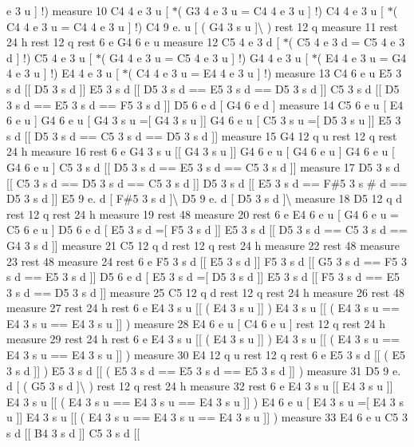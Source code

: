 e 3 u \mbox{]} !) measure 10 C4 4 e 3 u \mbox{[} $\ast$( G3 4 e 3 u = C4 4 e 3 u \mbox{]} !) C4 4 e 3 u \mbox{[} $\ast$( C4 4 e 3 u = C4 4 e 3 u \mbox{]} !) C4 9 e. u \mbox{[} ( G4 3 s u \mbox{]}\textbackslash{} ) rest 12 q measure 11 rest 24 h rest 12 q rest 6 e G4 6 e u measure 12 C5 4 e 3 d \mbox{[} $\ast$( C5 4 e 3 d = C5 4 e 3 d \mbox{]} !) C5 4 e 3 u \mbox{[} $\ast$( G4 4 e 3 u = C5 4 e 3 u \mbox{]} !) G4 4 e 3 u \mbox{[} $\ast$( E4 4 e 3 u = G4 4 e 3 u \mbox{]} !) E4 4 e 3 u \mbox{[} $\ast$( C4 4 e 3 u = E4 4 e 3 u \mbox{]} !) measure 13 C4 6 e u E5 3 s d \mbox{[}\mbox{[} D5 3 s d \mbox{]}\mbox{]} E5 3 s d \mbox{[}\mbox{[} D5 3 s d == E5 3 s d == D5 3 s d \mbox{]}\mbox{]} C5 3 s d \mbox{[}\mbox{[} D5 3 s d == E5 3 s d == F5 3 s d \mbox{]}\mbox{]} D5 6 e d \mbox{[} G4 6 e d \mbox{]} measure 14 C5 6 e u \mbox{[} E4 6 e u \mbox{]} G4 6 e u \mbox{[} G4 3 s u =\mbox{[} G4 3 s u \mbox{]}\mbox{]} G4 6 e u \mbox{[} C5 3 s u =\mbox{[} D5 3 s u \mbox{]}\mbox{]} E5 3 s d \mbox{[}\mbox{[} D5 3 s d == C5 3 s d == D5 3 s d \mbox{]}\mbox{]} measure 15 G4 12 q u rest 12 q rest 24 h measure 16 rest 6 e G4 3 s u \mbox{[}\mbox{[} G4 3 s u \mbox{]}\mbox{]} G4 6 e u \mbox{[} G4 6 e u \mbox{]} G4 6 e u \mbox{[} G4 6 e u \mbox{]} C5 3 s d \mbox{[}\mbox{[} D5 3 s d == E5 3 s d == C5 3 s d \mbox{]}\mbox{]} measure 17 D5 3 s d \mbox{[}\mbox{[} C5 3 s d == D5 3 s d == C5 3 s d \mbox{]}\mbox{]} D5 3 s d \mbox{[}\mbox{[} E5 3 s d == F\#5 3 s \# d == D5 3 s d \mbox{]}\mbox{]} E5 9 e. d \mbox{[} F\#5 3 s d \mbox{]}\textbackslash{} D5 9 e. d \mbox{[} D5 3 s d \mbox{]}\textbackslash{} measure 18 D5 12 q d rest 12 q rest 24 h measure 19 rest 48 measure 20 rest 6 e E4 6 e u \mbox{[} G4 6 e u = C5 6 e u \mbox{]} D5 6 e d \mbox{[} E5 3 s d =\mbox{[} F5 3 s d \mbox{]}\mbox{]} E5 3 s d \mbox{[}\mbox{[} D5 3 s d == C5 3 s d == G4 3 s d \mbox{]}\mbox{]} measure 21 C5 12 q d rest 12 q rest 24 h measure 22 rest 48 measure 23 rest 48 measure 24 rest 6 e F5 3 s d \mbox{[}\mbox{[} E5 3 s d \mbox{]}\mbox{]} F5 3 s d \mbox{[}\mbox{[} G5 3 s d == F5 3 s d == E5 3 s d \mbox{]}\mbox{]} D5 6 e d \mbox{[} E5 3 s d =\mbox{[} D5 3 s d \mbox{]}\mbox{]} E5 3 s d \mbox{[}\mbox{[} F5 3 s d == E5 3 s d == D5 3 s d \mbox{]}\mbox{]} measure 25 C5 12 q d rest 12 q rest 24 h measure 26 rest 48 measure 27 rest 24 h rest 6 e E4 3 s u \mbox{[}\mbox{[} ( E4 3 s u \mbox{]}\mbox{]} ) E4 3 s u \mbox{[}\mbox{[} ( E4 3 s u == E4 3 s u == E4 3 s u \mbox{]}\mbox{]} ) measure 28 E4 6 e u \mbox{[} C4 6 e u \mbox{]} rest 12 q rest 24 h measure 29 rest 24 h rest 6 e E4 3 s u \mbox{[}\mbox{[} ( E4 3 s u \mbox{]}\mbox{]} ) E4 3 s u \mbox{[}\mbox{[} ( E4 3 s u == E4 3 s u == E4 3 s u \mbox{]}\mbox{]} ) measure 30 E4 12 q u rest 12 q rest 6 e E5 3 s d \mbox{[}\mbox{[} ( E5 3 s d \mbox{]}\mbox{]} ) E5 3 s d \mbox{[}\mbox{[} ( E5 3 s d == E5 3 s d == E5 3 s d \mbox{]}\mbox{]} ) measure 31 D5 9 e. d \mbox{[} ( G5 3 s d \mbox{]}\textbackslash{} ) rest 12 q rest 24 h measure 32 rest 6 e E4 3 s u \mbox{[}\mbox{[} E4 3 s u \mbox{]}\mbox{]} E4 3 s u \mbox{[}\mbox{[} ( E4 3 s u == E4 3 s u == E4 3 s u \mbox{]}\mbox{]} ) E4 6 e u \mbox{[} E4 3 s u =\mbox{[} E4 3 s u \mbox{]}\mbox{]} E4 3 s u \mbox{[}\mbox{[} ( E4 3 s u == E4 3 s u == E4 3 s u \mbox{]}\mbox{]} ) measure 33 E4 6 e u C5 3 s d \mbox{[}\mbox{[} B4 3 s d \mbox{]}\mbox{]} C5 3 s d \mbox{[}\mbox{[} 